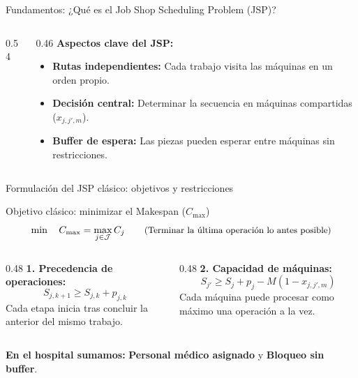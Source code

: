 \documentclass[aspectratio=169,11pt]{beamer}
\newcommand{\risk}[1]{\textcolor{warn}{\textbf{#1}}}
\newcommand{\destacado}[1]{\textcolor{primary}{\textbf{#1}}}
\begin{document}
\begin{frame}{Fundamentos: ¿Qué es el Job Shop Scheduling Problem (JSP)?}
\begin{columns}[c]
\begin{column}{0.54\textwidth}
    \end{column}

    \begin{column}{0.46\textwidth}
      \textbf{\color{primary}Aspectos clave del JSP:}
      \small
      \begin{itemize}
        \item \textbf{Rutas independientes:} Cada trabajo visita las máquinas en un orden propio.
        \item \textbf{Decisión central:} Determinar la secuencia en máquinas compartidas ($x_{j,j',m}$).
        \item \textbf{Buffer de espera:} Las piezas pueden esperar entre máquinas sin restricciones.
      \end{itemize}
    \end{column}
  \end{columns}
\end{frame}

\begin{frame}{Formulación del JSP clásico: objetivos y restricciones}
  \begin{block}{Objetivo clásico: minimizar el Makespan ($C_{\max}$)}
    $$\min \quad C_{\max} = \max_{j \in \mathcal{J}} C_j \qquad \text{\small (Terminar la última operación lo antes posible)}$$
  \end{block}

  \vspace{0.2cm}
  \begin{columns}[t]
    \begin{column}{0.48\textwidth}
      \textbf{\color{primary}1. Precedencia de operaciones:}
      \begin{equation*}
        S_{j, k+1} \ge S_{j, k} + p_{j,k}
      \end{equation*}
      \small Cada etapa inicia tras concluir la anterior del mismo trabajo.
    \end{column}

    \begin{column}{0.48\textwidth}
      \textbf{\color{primary}2. Capacidad de máquinas:}
      \begin{equation*}
        S_{j'} \ge S_j + p_j - M(1 - x_{j,j',m})
      \end{equation*}
      \small Cada máquina puede procesar como máximo una operación a la vez.
    \end{column}
  \end{columns}

  \vspace{0.4cm}
  \centering
  \small
  \destacado{En el hospital sumamos:} \textcolor{accent}{\textbf{Personal médico asignado}} y \risk{Bloqueo sin buffer}.
\end{frame}
\end{document}
